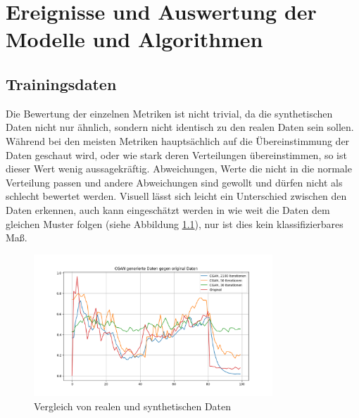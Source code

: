 
\chapter{Ereignisse und Auswertung der Modelle und Algorithmen}
\label{cha:events_and_evaluation}

\section{Trainingsdaten}
Die Bewertung der einzelnen Metriken ist nicht trivial, da die synthetischen Daten nicht nur ähnlich, sondern nicht identisch zu den realen Daten sein sollen. Während bei den meisten Metriken hauptsächlich auf die Übereinstimmung der Daten geschaut wird, oder wie stark deren Verteilungen übereinstimmen, so ist dieser Wert wenig aussagekräftig.
Abweichungen, Werte die nicht in die normale Verteilung passen und andere Abweichungen sind gewollt und dürfen nicht als schlecht bewertet werden.
Visuell lässt sich leicht ein Unterschied zwischen den Daten erkennen, auch kann eingeschätzt werden in wie weit die Daten dem gleichen Muster folgen (siehe Abbildung \ref{fig:real_vs_synth}), nur ist dies kein klassifizierbares Maß.



\begin{figure}[ht]
    \centering
    \includegraphics[width=0.8\textwidth]{includes/figures/real_vs_synth.png}
    \caption{Vergleich von realen und synthetischen Daten}
    \label{fig:real_vs_synth}
\end{figure}



